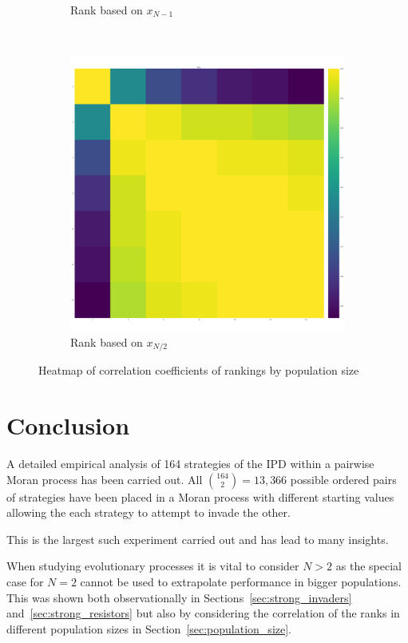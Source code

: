 \documentclass{article}
\begin{document}
\begin{figure}[!htbp]
\begin{subfigure}[t]{.3\textwidth}
        \caption{Rank based on \(x_{N - 1}\)}
    \end{subfigure}
    ~
    \begin{subfigure}[t]{.3\textwidth}
        \centering
        \includegraphics[width=.9\textwidth]{./img/correlation_heatmap_coexist.pdf}
        \caption{Rank based on \(x_{N/2}\)}
    \end{subfigure}
    \caption{Heatmap of correlation coefficients of rankings by population size}
    \label{fig:correlation_coefficients}
\end{figure}


\section{Conclusion}\label{sec:conclusion}

A detailed empirical analysis of 164 strategies of the IPD within a pairwise
Moran process has been carried out. All \(\binom{164}{2}=13,366\) possible
ordered pairs of strategies have been placed in a Moran process with different
starting values allowing the each strategy to attempt to invade the other.

This is the largest such experiment carried out and has lead to many insights.

When studying evolutionary processes it is vital to consider \(N>2\) as the
special case for \(N=2\) cannot be used to extrapolate performance in bigger
populations. This was shown both observationally in
Sections~\ref{sec:strong_invaders} and~\ref{sec:strong_resistors} but also by
considering the correlation of the ranks in different population sizes in
Section~\ref{sec:population_size}.
\end{document}
